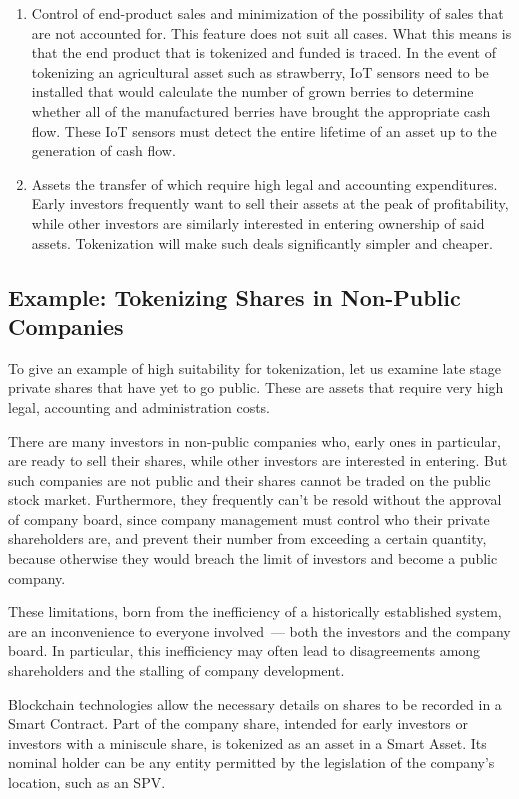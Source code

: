 \documentclass{article}
\begin{document}
\begin{multicols}{2}
\begin{enumerate}[label=(\alph*)]
\item Control of end-product sales and minimization of the possibility of sales that are not accounted for. This feature does not suit all cases. What this means is that the end product that is tokenized and funded is traced. In the event of tokenizing an agricultural asset such as strawberry, IoT sensors need to be installed that would calculate the number of grown berries to determine whether all of the manufactured berries have brought the appropriate cash flow. These IoT sensors must detect the entire lifetime of an asset up to the generation of cash flow.
\item Assets the transfer of which require high legal and accounting expenditures. Early investors frequently want to sell their assets at the peak of profitability, while other investors are similarly interested in entering ownership of said assets. Tokenization will make such deals significantly simpler and cheaper.
\end{enumerate}

\subsection{Example: Tokenizing Shares in Non-Public Companies}

To give an example of high suitability for tokenization, let us examine late stage private shares that have yet to go public.
These are assets that require very high legal, accounting and administration costs. 

There are many investors in non-public companies who, early ones in particular, are ready to sell their shares, while other investors are interested in entering. But such companies are not public and their shares cannot be traded on the public stock market. Furthermore, they frequently can’t be resold without the approval of company board, since company management must control who their private shareholders are, and prevent their number from exceeding a certain quantity, because otherwise they would breach the limit of investors and become a public company.

These limitations, born from the inefficiency of a historically established system, are an inconvenience to everyone involved~--- both the investors and the company board. In particular, this inefficiency may often lead to disagreements among shareholders and the stalling of company development.

Blockchain technologies allow the necessary details on shares to be recorded in a Smart Contract. Part of the company share, intended for early investors or investors with a miniscule share, is tokenized as an asset in a Smart Asset. Its nominal holder can be any entity permitted by the legislation of the company’s location, such as an SPV. 


\end{multicols}
\end{document}
